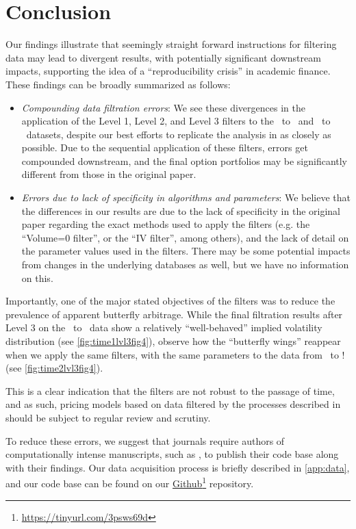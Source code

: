 \section{Conclusion} 

Our findings illustrate that seemingly straight forward instructions for filtering data may lead to divergent results, with potentially significant downstream impacts, supporting the idea of a ``reproducibility crisis'' in academic finance. These findings can be broadly summarized as follows:

\begin{itemize}
  \item \textit{Compounding data filtration errors}: We see these divergences in the application of the Level 1, Level 2, and Level 3 filters to the \STARTONE\ to \ENDONE\ and \STARTTWO\ to \ENDTWO\ datasets, despite our best efforts to replicate the analysis in \citet{constantinides2013} as closely as possible. Due to the sequential application of these filters, errors get compounded downstream, and the final option portfolios may be significantly different from those in the original paper.
  \item \textit{Errors due to lack of specificity in algorithms and parameters}: We believe that the differences in our results are due to the lack of specificity in the original paper regarding the exact methods used to apply the filters (e.g. the ``Volume=0 filter'', or the ``IV filter'', among others), and the lack of detail on the parameter values used in the filters. There may be some potential impacts from changes in the underlying databases as well, but we have no information on this. 
\end{itemize}

Importantly, one of the major stated objectives of the filters was to reduce the prevalence of apparent butterfly arbitrage. While the final filtration results after Level 3 on the \STARTONE\ to \ENDONE\ data show a relatively ``well-behaved'' implied volatility distribution (see \autoref{fig:time1lvl3fig4}), observe how the ``butterfly wings'' reappear when we apply the same filters, with the same parameters to the data from \STARTTWO\ to \ENDTWO! (see \autoref{fig:time2lvl3fig4}).

This is a clear indication that the filters are not robust to the passage of time, and as such, pricing models based on data filtered by the processes described in \citet{constantinides2013} should be subject to regular review and scrutiny.

To reduce these errors, we suggest that journals require authors of computationally intense manuscripts, such as \citet{constantinides2013}, to publish their code base along with their findings. Our data acquisition process is briefly described in \autoref{app:data}, and our code base can be found on our \href{https://tinyurl.com/3psws69d}{Github}\footnote{ \url{https://tinyurl.com/3psws69d} } repository.



